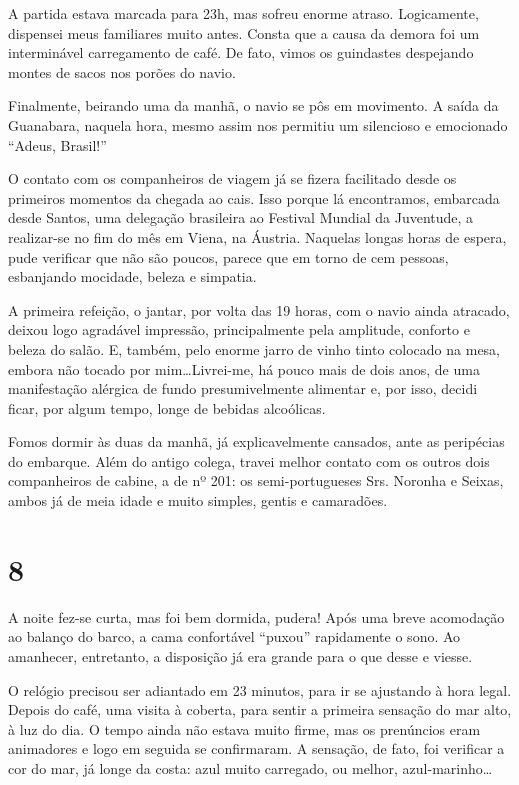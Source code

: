 A partida estava marcada para 23h, mas sofreu enorme atraso. Logicamente, dispensei meus familiares muito antes. Consta que a causa da demora foi um interminável carregamento de café. De fato, vimos os guindastes despejando montes de sacos nos porões do navio.

Finalmente, beirando uma da manhã, o navio se pôs em movimento. A saída da Guanabara, naquela hora, mesmo assim nos permitiu um silencioso e emocionado ``Adeus, Brasil!''

O contato com os companheiros de viagem já se fizera facilitado desde os primeiros momentos da chegada ao cais. Isso porque lá encontramos, embarcada desde Santos, uma delegação brasileira ao Festival Mundial da Juventude, a realizar-se no fim do mês em Viena, na Áustria. Naquelas longas horas de espera, pude verificar que não são poucos, parece que em torno de cem pessoas, esbanjando mocidade, beleza e simpatia.

A primeira refeição, o jantar, por volta das 19 horas, com o navio ainda atracado, deixou logo agradável impressão, principalmente pela amplitude, conforto e beleza do salão. E, também, pelo enorme jarro de vinho tinto colocado na mesa, embora não tocado por mim\ldots Livrei-me, há pouco mais de dois anos, de uma manifestação alérgica de fundo presumivelmente alimentar e, por isso, decidi ficar, por algum tempo, longe de bebidas alcoólicas.

Fomos dormir às duas da manhã, já explicavelmente cansados, ante as peripécias do embarque. Além do antigo colega, travei melhor contato com os outros dois companheiros de cabine, a de nº 201: os semi-portugueses Srs. Noronha e Seixas, ambos já de meia idade e muito simples, gentis e camaradões.

\section*{8 \adfflatleafright {}}
A noite fez-se curta, mas foi bem dormida, pudera! Após uma breve acomodação ao balanço do barco, a cama confortável ``puxou'' rapidamente o sono. Ao amanhecer, entretanto, a disposição já era grande para o que desse e viesse.

O relógio precisou ser adiantado em 23 minutos, para ir se ajustando à hora legal. Depois do café, uma visita à coberta, para sentir a primeira sensação do mar alto, à luz do dia. O tempo ainda não estava muito firme, mas os prenúncios eram animadores e logo em seguida se confirmaram. A sensação, de fato, foi verificar a cor do mar, já longe da costa: azul muito carregado, ou melhor, azul-marinho\ldots

